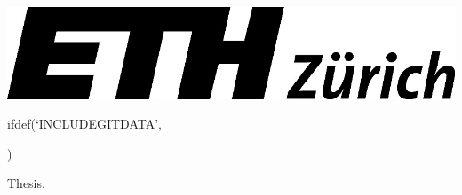 \documentclass[a4paper]{article}
\begin{document}
\includegraphics{assets/eth-logo.png}

ifdef(`INCLUDEGITDATA',




  )

Thesis.


\end{document}
